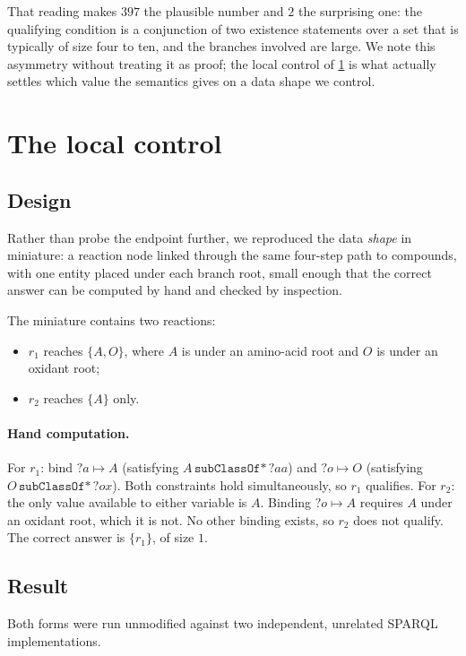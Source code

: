 \documentclass[11pt,a4paper]{article}
\theoremstyle{plain}
\theoremstyle{definition}
\theoremstyle{remark}
\begin{document}
That reading makes $397$ the plausible number and $2$ the surprising one: the
qualifying condition is a conjunction of two existence statements over a set
that is typically of size four to ten, and the branches involved are large. We
note this asymmetry without treating it as proof; the local control of
\cref{sec:control} is what actually settles which value the semantics gives on a
data shape we control.

\section{The local control}
\label{sec:control}

\subsection{Design}

Rather than probe the endpoint further, we reproduced the data \emph{shape} in
miniature: a reaction node linked through the same four-step path to compounds,
with one entity placed under each branch root, small enough that the correct
answer can be computed by hand and checked by inspection.

The miniature contains two reactions:
\begin{itemize}[leftmargin=1.6em]
\item $r_1$ reaches $\{A, O\}$, where $A$ is under an amino-acid root and $O$ is
under an oxidant root;
\item $r_2$ reaches $\{A\}$ only.
\end{itemize}

\paragraph{Hand computation.}
For $r_1$: bind $?a \mapsto A$ (satisfying $A\,\texttt{subClassOf*}\,?aa$) and
$?o \mapsto O$ (satisfying $O\,\texttt{subClassOf*}\,?ox$). Both constraints hold
simultaneously, so $r_1$ qualifies.
For $r_2$: the only value available to either variable is $A$. Binding
$?o \mapsto A$ requires $A$ under an oxidant root, which it is not. No other
binding exists, so $r_2$ does not qualify.
The correct answer is $\{r_1\}$, of size $1$.

\subsection{Result}

Both forms were run unmodified against two independent, unrelated SPARQL
implementations.
\end{document}
